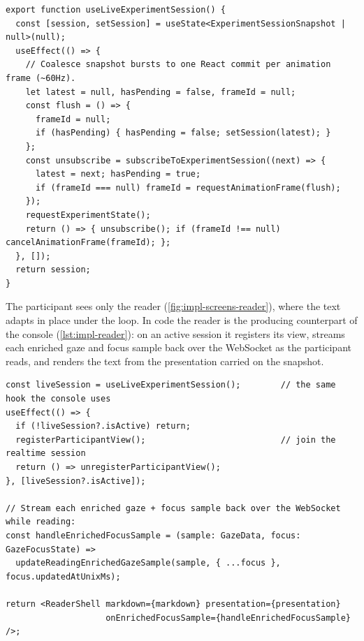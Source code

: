 \begin{listing}[htbp]
\begin{verbatim}
export function useLiveExperimentSession() {
  const [session, setSession] = useState<ExperimentSessionSnapshot | null>(null);
  useEffect(() => {
    // Coalesce snapshot bursts to one React commit per animation frame (~60Hz).
    let latest = null, hasPending = false, frameId = null;
    const flush = () => {
      frameId = null;
      if (hasPending) { hasPending = false; setSession(latest); }
    };
    const unsubscribe = subscribeToExperimentSession((next) => {
      latest = next; hasPending = true;
      if (frameId === null) frameId = requestAnimationFrame(flush);
    });
    requestExperimentState();
    return () => { unsubscribe(); if (frameId !== null) cancelAnimationFrame(frameId); };
  }, []);
  return session;
}
\end{verbatim}
\caption{Live-session hook shared by both screens (abbreviated from \texttt{lib/use-live-experiment-session.ts}). Coalesces snapshot bursts to one React commit per animation frame (\(\approx\)\SI{60}{\hertz}).}
\label{lst:impl-live-hook}
\end{listing}

The participant sees only the reader (\cref{fig:impl-screens-reader}), where the text adapts in place under the loop.
In code the reader is the producing counterpart of the console (\cref{lst:impl-reader}): on an active session it registers its view, streams each enriched gaze and focus sample back over the WebSocket as the participant reads, and renders the text from the presentation carried on the snapshot.

\begin{listing}[htbp]
\begin{verbatim}
const liveSession = useLiveExperimentSession();        // the same hook the console uses
useEffect(() => {
  if (!liveSession?.isActive) return;
  registerParticipantView();                           // join the realtime session
  return () => unregisterParticipantView();
}, [liveSession?.isActive]);

// Stream each enriched gaze + focus sample back over the WebSocket while reading:
const handleEnrichedFocusSample = (sample: GazeData, focus: GazeFocusState) =>
  updateReadingEnrichedGazeSample(sample, { ...focus }, focus.updatedAtUnixMs);

return <ReaderShell markdown={markdown} presentation={presentation}
                    onEnrichedFocusSample={handleEnrichedFocusSample} />;
\end{verbatim}
\caption{Participant reader (abbreviated from \texttt{ReadingPage.tsx}): registers the view, renders text from the snapshot presentation, and streams enriched gaze samples over the WebSocket.}
\label{lst:impl-reader}
\end{listing}

